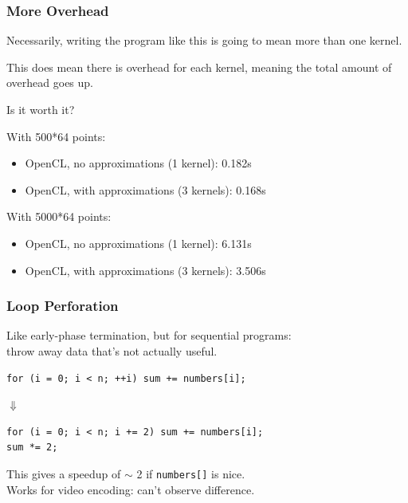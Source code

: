 \begin{frame}
\frametitle{More Overhead}

Necessarily, writing the program like this is going to mean more than one kernel.

This does mean there is overhead for each kernel, meaning the total amount of overhead goes up. 

Is it worth it? 

With 500*64 points:
\begin{itemize}
\item    OpenCL, no approximations (1 kernel): 0.182s
\item    OpenCL, with approximations (3 kernels): 0.168s
\end{itemize}

With 5000*64 points:
\begin{itemize}
\item    OpenCL, no approximations (1 kernel): 6.131s
\item    OpenCL, with approximations (3 kernels): 3.506s
\end{itemize}


\end{frame}





\begin{frame}[fragile]
  \frametitle{Loop Perforation}


  Like early-phase termination, but for sequential programs:\\
  \qquad throw away data that's not actually useful.

  \begin{lstlisting}
for (i = 0; i < n; ++i) sum += numbers[i];
  \end{lstlisting}

  \begin{center}
    $\Downarrow$
  \end{center}

  \begin{lstlisting}
for (i = 0; i < n; i += 2) sum += numbers[i];
sum *= 2;
  \end{lstlisting}

  This gives a speedup of $\sim$ 2 if {\tt numbers[]} is nice.\\[1em]

  Works for video encoding: can't observe difference.



\end{frame}

